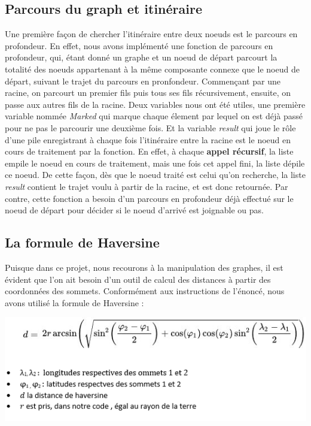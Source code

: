 \documentclass[french]{article}
\begin{document}
\subsection{Parcours du graph et itinéraire}
Une première façon de chercher l'itinéraire entre deux noeuds est le parcours en profondeur. En effet, nous avons implémenté une fonction de parcours en profondeur, qui, étant donné un graphe et un noeud de départ parcourt la totalité des noeuds appartenant à la même composante connexe que le noeud de départ, suivant le trajet du parcours en pronfondeur. Commençant par une racine, on parcourt un premier fils puis tous ses fils récursivement, ensuite, on passe aux autres fils de la racine. Deux variables nous ont été utiles, une première variable nommée \textit{Marked} qui marque chaque élement par lequel on est déj\`a passé pour ne pas le parcourir une deuxième fois. Et la variable \textit{result} qui joue le rôle d'une pile enregistrant à chaque fois l'itinéraire entre la racine est le noeud en cours de traitement par la fonction. En effet, à chaque \textbf{appel récursif}, la liste empile le noeud en cours de traitement, mais une fois cet appel fini, la liste dépile ce noeud. De cette façon, dès que le noeud traité est celui qu'on recherche, la liste \textit{result} contient le trajet voulu à partir de la racine, et est donc retournée. Par contre, cette fonction a besoin d'un parcours en profondeur déj\`a effectué sur le noeud de départ pour décider si le noeud d'arrivé est joignable ou pas.

\subsection{La formule de Haversine} %
Puisque dans ce projet, nous recourons à la manipulation des graphes, il est évident que l'on ait besoin d'un outil de calcul des distances à partir des coordonnées des sommets. Conformément aux instructions de l'énoncé, nous avons utilisé la formule de Haversine :
\newline
\begin{center}
\includegraphics[scale=0.9]{hav.png}
\end{center}
\end{document}
